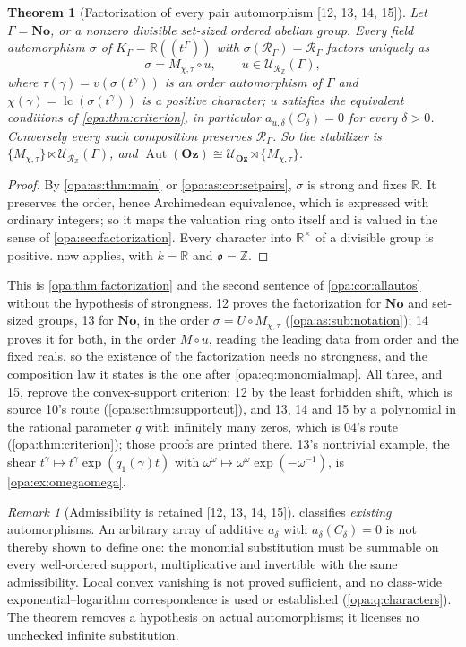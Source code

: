 \documentclass[11pt,oneside]{article}
\numberwithin{equation}{section}
\newtheorem{theorem}{Theorem}[section]
\theoremstyle{definition}
\theoremstyle{remark}
\newtheorem{remark}[remark]{Remark}
\newcommand{\No}{\mathbf{No}}
\newcommand{\Oz}{\mathbf{Oz}}
\newcommand{\R}{\mathbb R}
\newcommand{\Z}{\mathbb Z}
\newcommand{\oo}{\mathfrak o}
\newcommand{\UU}{\mathcal U}
\newcommand{\Aut}{\operatorname{Aut}}
\newcommand{\lc}{\operatorname{lc}}
\newcommand{\Hahn}[2]{#1((t^{#2}))}
\newcommand{\src}[1]{\textup{\textsf{\small[#1]}}}
\begin{document}
\begin{theorem}[Factorization of every pair automorphism \src{12, 13, 14, 15}]\label{opa:as:thm:factor}
Let $\Gamma=\No$, or a nonzero divisible set-sized ordered abelian group. Every field
automorphism $\sigma$ of $K_\Gamma=\Hahn\R\Gamma$ with $\sigma(\mathcal R_\Gamma)=\mathcal
R_\Gamma$ factors uniquely as
\[
 \sigma=M_{\chi,\tau}\circ u,\qquad u\in\UU_{\mathcal R_\Z}(\Gamma),
\]
where $\tau(\gamma)=v(\sigma(t^\gamma))$ is an order automorphism of $\Gamma$ and
$\chi(\gamma)=\lc(\sigma(t^\gamma))$ is a positive character; $u$ satisfies the equivalent
conditions of \cref{opa:thm:criterion}, in particular $a_{u,\delta}(C_\delta)=0$ for every
$\delta>0$. Conversely every such composition preserves $\mathcal R_\Gamma$. So the
stabilizer is $\{M_{\chi,\tau}\}\ltimes\UU_{\mathcal R_\Z}(\Gamma)$, and
$\Aut(\Oz)\cong\UU_\Oz\rtimes\{M_{\chi,\tau}\}$.
\end{theorem}
\begin{proof}
By \cref{opa:as:thm:main} or \cref{opa:as:cor:setpairs}, $\sigma$ is strong and fixes $\R$.
It preserves the order, hence Archimedean equivalence, which is expressed with ordinary
integers; so it maps the valuation ring onto itself and is valued in the sense of
\cref{opa:sec:factorization}. Every character into $\R^\times$ of a divisible group is
positive.  now applies, with $k=\R$ and $\oo=\Z$.
\end{proof}

This is \cref{opa:thm:factorization} and the second sentence of \cref{opa:cor:allautos}
without the hypothesis of strongness. 12 proves the factorization for $\No$ and set-sized
groups, 13 for $\No$, in the order $\sigma=U\circ M_{\chi,\tau}$
(\cref{opa:as:sub:notation}); 14 proves it for both, in the order $M\circ u$, reading the
leading data from order and the fixed reals, so the existence of the factorization needs no
strongness, and the composition law it states is the one after
\eqref{opa:eq:monomialmap}. All three, and 15, reprove the convex-support criterion: 12 by the least
forbidden shift, which is source 10's route (\cref{opa:sc:thm:supportcut}), and 13, 14 and 15 by a
polynomial in the rational parameter $q$ with infinitely many zeros, which is 04's route
(\cref{opa:thm:criterion}); those proofs are printed there. 13's nontrivial example, the shear
$t^\gamma\mapsto t^\gamma\exp(q_1(\gamma)t)$ with $\omega^\omega\mapsto\omega^\omega\exp(-\omega^{-1})$,
is \cref{opa:ex:omegaomega}.

\begin{remark}[Admissibility is retained \src{12, 13, 14, 15}]\label{opa:as:rem:admissible}
 classifies \emph{existing} automorphisms. An arbitrary array of
additive $a_\delta$ with $a_\delta(C_\delta)=0$ is not thereby shown to define one: the
monomial substitution must be summable on every well-ordered support, multiplicative and
invertible with the same admissibility. Local convex vanishing is not proved sufficient,
and no class-wide exponential--logarithm correspondence is used or established
(\cref{opa:q:characters}). The theorem removes a hypothesis on actual automorphisms; it
licenses no unchecked infinite substitution.
\end{remark}
\end{document}
